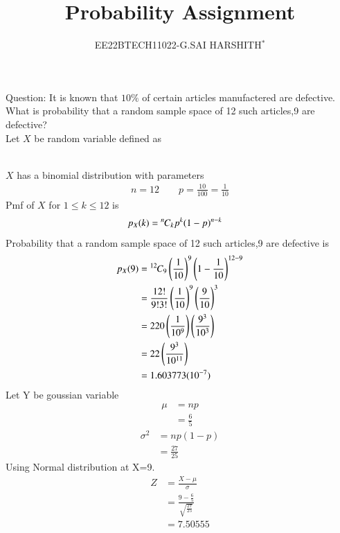 \documentclass[journal,12pt,twocolumn]{IEEEtran}
\theoremstyle{remark}
\begin{document}

\vspace{3cm}

\title{Probability Assignment}
\author{EE22BTECH11022-G.SAI HARSHITH$^{*}$%
}
\maketitle
\newpage
\bigskip
\renewcommand{\thefigure}{\theenumi}
\renewcommand{\thetable}{\theenumi}

Question: It is known that $10\%$ of certain articles manufactered are defective. What is probability that a random sample space of 12 such articles,9 are defective?\\
\solution
Let $X$ be random variable defined as
\begin{table}[!ht]
	
\end{table}\\
$X$ has a binomial distribution with parameters
\begin{align}
n=12 \qquad p=\frac{10}{100}=\frac{1}{10}
\end{align}
Pmf of $X$ for $1 \leq k \leq 12$ is
\begin{align}
p_X(k)&={{}^{n}\mkern-1muC_{k}}p^k(1-p)^{n-k}
\end{align}
Probability that a random sample space of 12 such articles,9 are defective is
\begin{align}
p_X(9)&={{}^{12}\mkern-1muC_{9}}\left(\frac{1}{10}\right)^9\left(1-\frac{1}{10}\right)^{12-9}\\
&=\frac{12!}{9!3!}\left(\frac{1}{10}\right)^9\left(\frac{9}{10}\right)^{3}\\
&=220\left(\frac{1}{10^9}\right)\left(\frac{9^3}{10^3}\right)\\
&=22\left(\frac{9^3}{10^{11}}\right)\\
&=1.603773(10^{-7})
\label{eq:12}
\end{align}
Let Y be goussian variable
\begin{align}
\mu&=np\\
&=\frac{6}{5}
\end{align}
\begin{align}
\sigma^2&=np(1-p)\\
&=\frac{27}{25}
\end{align}
Using Normal distribution at X=9.
\begin{align}
Z&=\frac{X-\mu}{\sigma}\\
&=\frac{9-\frac{6}{5}}{\sqrt{\frac{27}{25}}}\\
&=7.50555
\end{align}
\end{document}

